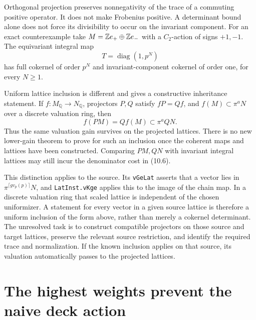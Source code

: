 Orthogonal projection preserves nonnegativity of the trace of
a commuting positive operator. It does not make Frobenius
positive. A determinant bound alone does not force its divisibility
to occur on the invariant component. For an exact counterexample
take $M=\mathbb Z e_+\oplus\mathbb Z e_-$ with a $C_2$-action of signs
$+1,-1$. The equivariant integral map
\[
                 T=\operatorname{diag}(1,p^N)
                                                        \tag{10.7}
\]
has full cokernel of order $p^N$ and invariant-component
cokernel of order one, for every $N\ge1$.

Uniform lattice inclusion is different and gives a constructive
inheritance statement. If $f:M_{\mathbb Q}\to N_{\mathbb Q}$,
projectors $P,Q$ satisfy $fP=Qf$, and
$f(M)\subset\pi^a N$ over a discrete valuation ring, then
\[
                    f(PM)=Qf(M)\subset\pi^a QN.
                                                        \tag{10.8}
\]
Thus the same valuation gain survives on the projected lattices.
There is no new lower-gain theorem to prove for such an inclusion
once the coherent maps and lattices have been constructed. Comparing
$PM,QN$ with invariant integral lattices may still incur the
denominator cost in (10.6).

This distinction applies to the source. Its \texttt{vGeLat}
asserts that a vector lies in
$\pi^{\lceil g v_p(p)\rceil}N$, and \texttt{LatInst.vKge}
applies this to the image of the chain map. In a discrete valuation
ring that scaled lattice is independent of the chosen uniformizer.
A statement for every vector in a given source lattice is therefore
a uniform inclusion of the form above, rather than merely a
cokernel determinant. The unresolved task is to construct compatible
projectors on those source and target lattices, preserve the
relevant source restriction, and identify the required trace and
normalization. If the known inclusion applies on that source,
its valuation automatically passes to the projected lattices.

\section{The highest weights prevent the naive deck action}
\label{sec:highest}

